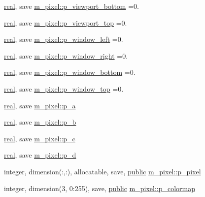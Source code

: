 \begin{DoxyCompactItemize}
\hyperlink{read__watch_83_8txt_abdb62bde002f38ef75f810d3a905a823}{real}, save \hyperlink{namespacem__pixel_a1bcd9c34bcf4869912b4267964b5e92d}{m\+\_\+pixel\+::p\+\_\+viewport\+\_\+bottom} =0.
\item 
\hyperlink{read__watch_83_8txt_abdb62bde002f38ef75f810d3a905a823}{real}, save \hyperlink{namespacem__pixel_a127bd1570b649951e9f064c65e71945c}{m\+\_\+pixel\+::p\+\_\+viewport\+\_\+top} =0.
\item 
\hyperlink{read__watch_83_8txt_abdb62bde002f38ef75f810d3a905a823}{real}, save \hyperlink{namespacem__pixel_a03d347205feb2f06305a014717de8b26}{m\+\_\+pixel\+::p\+\_\+window\+\_\+left} =0.
\item 
\hyperlink{read__watch_83_8txt_abdb62bde002f38ef75f810d3a905a823}{real}, save \hyperlink{namespacem__pixel_a213461921eae5a7ec6d2eb399cf849da}{m\+\_\+pixel\+::p\+\_\+window\+\_\+right} =0.
\item 
\hyperlink{read__watch_83_8txt_abdb62bde002f38ef75f810d3a905a823}{real}, save \hyperlink{namespacem__pixel_a5956f9820f460143df9022d9eb7f833d}{m\+\_\+pixel\+::p\+\_\+window\+\_\+bottom} =0.
\item 
\hyperlink{read__watch_83_8txt_abdb62bde002f38ef75f810d3a905a823}{real}, save \hyperlink{namespacem__pixel_ab8c6c7f81ee857e70e77b08de015d416}{m\+\_\+pixel\+::p\+\_\+window\+\_\+top} =0.
\item 
\hyperlink{read__watch_83_8txt_abdb62bde002f38ef75f810d3a905a823}{real}, save \hyperlink{namespacem__pixel_a67dc9122cf985392ef839d0e01bdd175}{m\+\_\+pixel\+::p\+\_\+a}
\item 
\hyperlink{read__watch_83_8txt_abdb62bde002f38ef75f810d3a905a823}{real}, save \hyperlink{namespacem__pixel_a54a88e65093f2eebae449b44eb9188ed}{m\+\_\+pixel\+::p\+\_\+b}
\item 
\hyperlink{read__watch_83_8txt_abdb62bde002f38ef75f810d3a905a823}{real}, save \hyperlink{namespacem__pixel_a4f7e47e7c8108aea8b5e41bc4cde3cf4}{m\+\_\+pixel\+::p\+\_\+c}
\item 
\hyperlink{read__watch_83_8txt_abdb62bde002f38ef75f810d3a905a823}{real}, save \hyperlink{namespacem__pixel_aedcfb264a04a70d3dba9dc7c347bdf37}{m\+\_\+pixel\+::p\+\_\+d}
\item 
integer, dimension(\+:,\+:), allocatable, save, \hyperlink{M__stopwatch_83_8txt_a2f74811300c361e53b430611a7d1769f}{public} \hyperlink{namespacem__pixel_abdde5773f7569de72bb28d6818a44914}{m\+\_\+pixel\+::p\+\_\+pixel}
\item 
integer, dimension(3, 0\+:255), save, \hyperlink{M__stopwatch_83_8txt_a2f74811300c361e53b430611a7d1769f}{public} \hyperlink{namespacem__pixel_aa6b9c445365db696d6a7a9a794ceba43}{m\+\_\+pixel\+::p\+\_\+colormap}

\end{DoxyCompactItemize}
